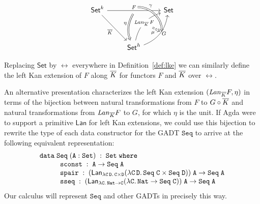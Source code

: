 \documentclass{lmcs}
\theoremstyle{plain}\newtheorem{satz}[thm]{Satz}
\newcommand{\set}{\mathsf{Set}}
\begin{document}
{\begin{defi}
\vspace*{-0.05in}

\[
\begin{tikzcd}[row sep = huge]
\set^k
\ar[rr, "{F}"{name=Fa, above}, ""{name=F, below}]
\ar[rd, "{\ol K}"']
&& \set \\
& \set^h
\ar[Rightarrow, bend right = 25, from=F, "{\eta}"']
\ar[ur, bend left, "{\mathit{Lan}_{\ol K}\,F}"{name=Lan, description}]
\ar[ur, bend right, "{G}"'{name=L, right}, ""'{name=Lr, right}]
\ar[Rightarrow, bend left = 45, from=Fa, to=Lr, "{\gamma}" near start]
\ar[Rightarrow, dashed, from=Lan, to=L, "{\mu}"']
\end{tikzcd}
\]

\vspace*{0.05in}

\noindent
Replacing $\set$ by $\rel$ everywhere in Definition~\ref{def:lke} we
can similarly define the left Kan extension of $F$ along $\overline{K}$ for
functors $F$ and $\overline{K}$ over $\rel$.
\end{defi}

An alternative presentation characterizes the left Kan extension
$(\mathit{Lan}_{\overline{K}} F, \eta)$ in terms of the bijection between
natural transformations from $F$ to $G \circ \overline{K}$ and natural
transformations from $\mathit{Lan}_{\overline{K}} F$ to $G$, for which
$\eta$ is the unit. If Agda were to support a primitive
$\mathsf{Lan}$ for left Kan extensions, we could use this bijection
to rewrite the type of each data constructor for the GADT
$\mathtt{Seq}$ to arrive at the following equivalent representation:
\[\begin{array}{l}
\mathtt{data\; Seq \;(A : Set)\;:\;Set\;where}\\
\hspace*{0.4in}\mathtt{sconst\;:\; A \rightarrow Seq\;A}\\
\hspace*{0.4in}\mathtt{spair\;:\;(\mathsf{Lan}_{\lambda C\,D.\,C \times D}
  (\lambda C\,D.\,Seq\;C\times Seq\;D))\;A \rightarrow Seq\;A}\\ 
\hspace*{0.4in}\mathtt{sseq\;:\;(\mathsf{Lan}_{\lambda C.\,Nat \to C}
  (\lambda C.\,Nat \rightarrow Seq\;C))\;A \rightarrow
  Seq\;A}
\end{array}\]
\noindent
\!\!Our calculus will represent $\mathtt{Seq}$ and other GADTs in
precisely this way.

\vspace*{0.05in}

}
\end{document}
